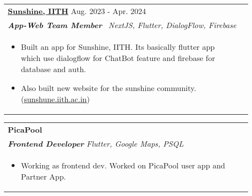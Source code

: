 \documentclass[a4paper,8pt]{article}
\begin{document}
\begin{tabularx}{\linewidth}{ @{}l r@{} }
\color[HTML]{1C033C} \textbf{\uline{Sunshine, IITH}} \hfill \color[HTML]{371e77} Aug. 2023 - Apr. 2024 \\[4pt]
\color[HTML]{371e77}\textbf{\textit{App-Web Team Member}}\ \hfill \color[HTML]{4B28A4} \textit{NextJS, Flutter, DialogFlow, Firebase} \\[5pt]
\begin{minipage}[t]{\linewidth}
    \begin{itemize}[nosep,after=\strut, leftmargin=2em, itemsep=2pt]
        \item Built an app for Sunshine, IITH. Its basically flutter app which use dialogflow for ChatBot feature and firebase for database and auth.
        \item Also built new website for the sunshine community. ({\href{https://sunshune.iith.ac.in}{sunshune.iith.ac.in}})
    \end{itemize}
\end{minipage}
\end{tabularx}

\begin{tabularx}{\linewidth}{ @{}l r@{} }
\color[HTML]{1C033C} \textbf{PicaPool} \hfill \color[HTML]{371e77}  \\[4pt]
\color[HTML]{371e77}\textbf{\textit{Frontend Developer}} \hfill \color[HTML]{4B28A4} \textit{Flutter, Google Maps, PSQL} \\[5pt]
\begin{minipage}[t]{\linewidth}
    \begin{itemize}[nosep,after=\strut, leftmargin=2em, itemsep=2pt]
        \item Working as frontend dev. Worked on PicaPool user app and Partner App.
    \end{itemize}
    \end{minipage}
\end{tabularx}

\end{document}
